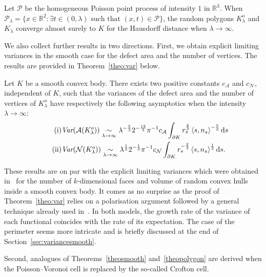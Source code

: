 \documentclass[AHL,Unicode,longabstracts,published]{cedram}
\newcommand{\cA}{\mathcal{A}}
\newcommand{\cN}{\mathcal{N}}
\newcommand{\cP}{\mathcal{P}}
\newcommand{\dd}{\mathrm{d}}
\newcommand{\R}{\mathbb{R}}
\newcommand{\pass}{\vspace{0.3cm}\noindent}
\let\oldexists\exists
\renewcommand*{\exists}{\mathrel{\oldexists}}
\newcommand{\R}{\mathbb{R}}
\begin{document}
\begin{coro}\label{cor:bonustrack}
Let ${\cP}$ be the homogeneous Poisson point process of intensity $1$ in $\R^3$. When ${\cP}_\lambda=\{x\in\R^2:\exists t\in (0,\lambda) \text{ such that } (x,t)\in \cP\}$, the random polygons $K_\lambda^o$ and $K_\lambda$ converge almost surely to $K$ for the Hausdorff distance when $\lambda\to\infty$.
\end{coro}

We also collect further results in two directions. First, we obtain explicit limiting variances in the smooth case for the defect area and the number of vertices. The results are provided in Theorem~\ref{theo:var} below.

\begin{theo}\label{theo:var}
Let $K$ be a smooth convex body. There exists two positive constants $c_{\cA}$ and $c_{\cN}$, independent of $K$, such that the variances of the defect area and the number of vertices of $K_{\lambda}^o$ have respectively the following asymptotics when the intensity $\lambda\to\infty:$
\begin{align}
\tag{$\rm i$}\label{theo1.5.i} &\emph{Var}(\cA(K_{\lambda}^o))\underset{\lambda\to\infty}{\sim}\lambda^{-\frac{5}{3}}2^{-\frac{13}{3}}\pi^{-1}c_{\cA}\int_{\partial K} r_s^{\frac4{3}}\left\langle s,n_s\right\rangle^{-\frac{5}{3}}\dd s\\
\tag{$\rm ii$}\label{theo1.5.ii} &\emph{Var}(\cN(K_{\lambda}^o))\underset{\lambda\to\infty}{\sim}\lambda^{\frac{1}{3}}2^{-\frac{1}{3}}\pi^{-1}c_{\cN}\int_{\partial K} r_s^{-\frac{2}{3}}\left\langle s,n_s\right\rangle^{\frac1{3}}\dd s.
\end{align}
\end{theo}

These results are on par with the explicit limiting variances which were obtained in~\cite{cy14} for the number of $k$-dimensional faces and volume of random convex hulls inside a smooth convex body. It comes as no surprise as the proof of Theorem~\ref{theo:var} relies on a polarisation argument followed by a general technique already used in~\cite{cy14}. In both models, the growth rate of the variance of each functional coincides with the rate of its expectation. The case of the perimeter seems more intricate and is briefly discussed at the end of Section~\ref{sec:variancesmooth}.

Second, analogues of Theorems~\ref{theosmooth} and~\ref{theopolygon} are derived when the Poisson--Voronoi cell is replaced by the so-called Crofton cell.
\end{document}
